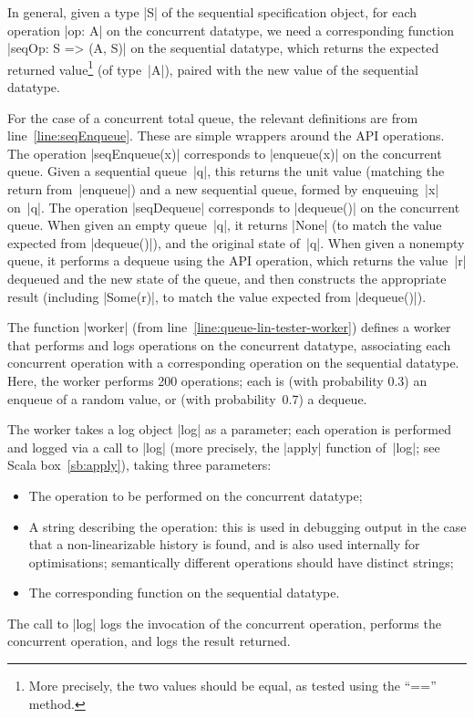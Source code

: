 In general, given a type |S| of the sequential specification object, for each
operation |op: A| on the concurrent datatype, we need a corresponding function
|seqOp: S => (A, S)| on the sequential datatype, which returns the expected
returned value\footnote{More precisely, the two values should be equal, as
  tested using the ``{\scalashape ==}'' method.} (of type~|A|), paired with
the new value of the sequential datatype.

For the case of a concurrent total queue, the relevant definitions are from
line~\ref{line:seqEnqueue}.  These are simple wrappers around the API
operations.  The operation |seqEnqueue(x)| corresponds to |enqueue(x)| on the
concurrent queue.  Given a sequential queue~|q|, this returns the unit value
(matching the return from~|enqueue|) and a new sequential queue, formed by
enqueuing~|x| on~|q|.  The operation |seqDequeue| corresponds to |dequeue()|
on the concurrent queue.  When given an empty queue~|q|, it returns |None| (to
match the value expected from |dequeue()|), and the original state of~|q|.
When given a nonempty queue, it performs a dequeue using the API
operation, which returns the value~|r| dequeued and the new state of the
queue, and then constructs the appropriate result (including |Some(r)|, to
match the value expected from |dequeue()|).


The function |worker| (from line~\ref{line:queue-lin-tester-worker}) defines
a worker that performs and logs operations on the concurrent datatype,
associating each concurrent operation with a corresponding operation on the
sequential datatype.  Here, the worker performs 200 operations; each is (with
probability 0.3) an enqueue of a random value, or (with probability~0.7) a
dequeue.


The worker takes a log object |log| as a parameter; each operation is
performed and logged via a call to |log| (more precisely, the |apply| function
of~|log|; see Scala box~\ref{sb:apply}), taking three parameters:
%
\begin{itemize}
\item
The operation to be performed on the concurrent datatype;

\item A string describing the operation: this is used in debugging output in
  the case that a non-linearizable history is found, and is also used
  internally for optimisations; semantically different operations should have
  distinct strings;

\item
The corresponding function on the sequential datatype.
\end{itemize}
%
The call to |log| logs the invocation of the concurrent operation,
performs the concurrent operation, and logs the result returned.

